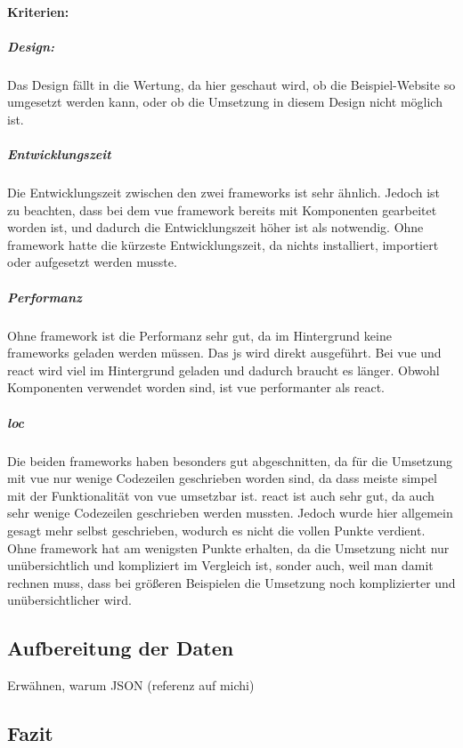 \paragraph{Kriterien:}
\subparagraph{Design:}
Das Design fällt in die Wertung, da hier geschaut wird, ob die Beispiel-Website so umgesetzt werden kann, oder ob die Umsetzung in diesem Design nicht möglich ist.
\subparagraph{Entwicklungszeit}
Die Entwicklungszeit zwischen den zwei \Gls{framework}s ist sehr ähnlich. Jedoch ist zu beachten, dass bei dem \Gls{vue} \Gls{framework} bereits mit Komponenten gearbeitet worden ist, und dadurch die Entwicklungszeit höher ist als notwendig. Ohne \Gls{framework} hatte die kürzeste Entwicklungszeit, da nichts installiert, importiert oder aufgesetzt werden musste.
\subparagraph{Performanz}
Ohne \Gls{framework} ist die Performanz sehr gut, da im Hintergrund keine \Gls{framework}s geladen werden müssen. Das \Gls{js} wird direkt ausgeführt. Bei \Gls{vue} und \Gls{react} wird viel im Hintergrund geladen und dadurch braucht es länger. Obwohl Komponenten verwendet worden sind, ist \Gls{vue} performanter als \Gls{react}.
\subparagraph{\Gls{loc}}
Die beiden \Gls{framework}s haben besonders gut abgeschnitten, da für die Umsetzung mit \Gls{vue} nur wenige Codezeilen geschrieben worden sind, da dass meiste simpel mit der Funktionalität von \Gls{vue} umsetzbar ist. \Gls{react} ist auch sehr gut, da auch sehr wenige Codezeilen geschrieben werden mussten. Jedoch wurde hier allgemein gesagt mehr selbst geschrieben, wodurch es nicht die vollen Punkte verdient. Ohne \Gls{framework} hat am wenigsten Punkte erhalten, da die Umsetzung nicht nur unübersichtlich und kompliziert im Vergleich ist, sonder auch, weil man damit rechnen muss, dass bei größeren Beispielen die Umsetzung noch komplizierter und unübersichtlicher wird.
\subsection{Aufbereitung der Daten}
Erwähnen, warum JSON (referenz auf michi)
\subsection{Fazit}